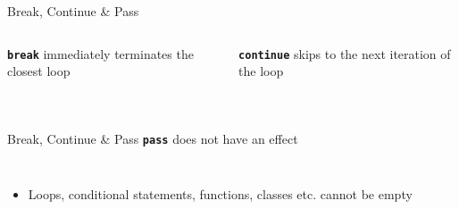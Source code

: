         \begin{frame}{Break, Continue \& Pass}
            \begin{columns}
                \begin{column}{0.5\textwidth}
                    \textbf{\texttt{break}} immediately terminates the closest loop
                    \bigskip  
                    \inputminted[frame=single,framesep=2pt]{python3}{../Lecture3/code-examples/break1.py}
                    \pause
                    \inputminted[frame=single,framesep=2pt]{python3}{../Lecture3/code-examples/break2.py}
                \end{column}
               \pause 
                \begin{column}{0.5\textwidth}
                    \textbf{\texttt{continue}} skips to the next iteration of the loop
                    \bigskip  
                    \inputminted[frame=single,framesep=2pt]{python3}{../Lecture3/code-examples/continue1.py}
                    \pause
                    \inputminted[frame=single,framesep=2pt]{python3}{../Lecture3/code-examples/continue2.py}
                \end{column} 
            \end{columns}
        \end{frame}
        
        \begin{frame}{Break, Continue \& Pass}
            \pause
            \LARGE
            \textbf{\texttt{pass}} does not have an effect
            \bigskip  
            \inputminted[frame=single,framesep=2pt]{python3}{../Lecture3/code-examples/pass.py}
            \inputminted[frame=single,framesep=2pt,lastline=2]{python3}{code-examples/pass_class.py}
            \pause
            \begin{itemize}
                \item Loops, conditional statements, functions, classes etc. cannot be empty 
            \end{itemize}
        \end{frame}
